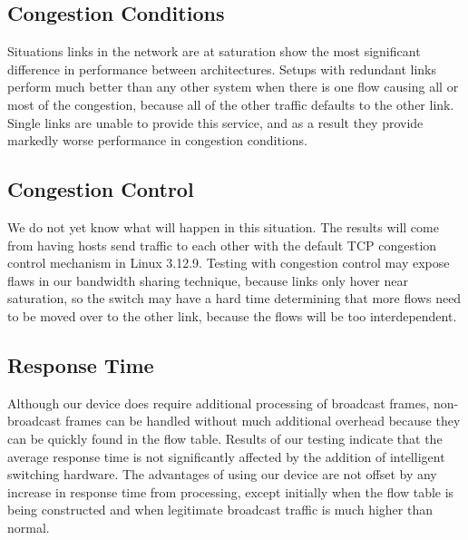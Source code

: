   \subsection{Congestion Conditions}
    Situations links in the network are at saturation show the most significant difference in performance between architectures.
    Setups with redundant links perform much better than any other system when there is one flow causing all or most of the congestion, because all of  the other traffic defaults to the other link.
    Single links are unable to provide this service, and as a result they provide markedly worse performance in congestion conditions.

  \subsection{Congestion Control}
    We do not yet know what will happen in this situation.
    The results will come from having hosts send traffic to each other with the default TCP congestion control mechanism in Linux 3.12.9.
    Testing with congestion control may expose flaws in our bandwidth sharing technique, because links only hover near saturation, so the switch may have a hard time determining that more flows need to be moved over to the other link, because the flows will be too interdependent.

  \subsection{Response Time}
    Although our device does require additional processing of broadcast frames, non-broadcast frames can be handled without much additional overhead because they can be quickly found in the flow table.
    Results of our testing indicate that the average response time is not significantly affected by the addition of intelligent switching hardware.
    The advantages of using our device are not offset by any increase in response time from processing, except initially when the flow table is being constructed and when legitimate broadcast traffic is much higher than normal.
